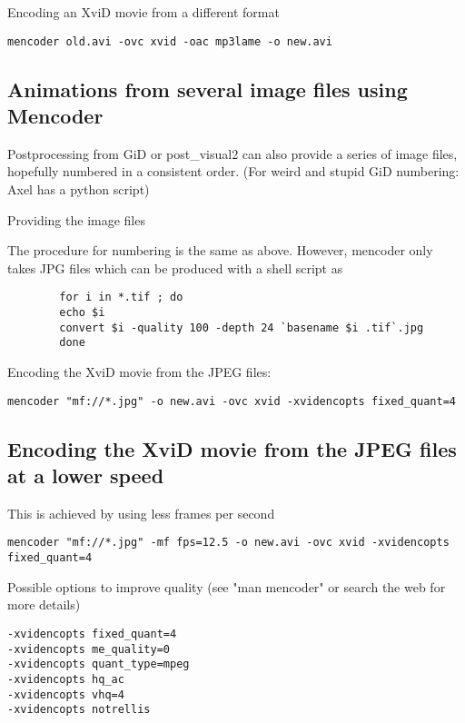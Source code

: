  Encoding an XviD movie from a different format

\begin{verbatim}
mencoder old.avi -ovc xvid -oac mp3lame -o new.avi
\end{verbatim}

\subsection{Animations from several image files using Mencoder}

 Postprocessing from GiD or post\_visual2 can also provide a series of
image files, hopefully numbered in a consistent order. (For weird and
stupid GiD numbering: Axel has a python script)

Providing the image files

 The procedure for numbering is the same as above. However, mencoder
only takes JPG files which can be produced with a shell script as

\begin{verbatim}
        for i in *.tif ; do
        echo $i
        convert $i -quality 100 -depth 24 `basename $i .tif`.jpg
        done
\end{verbatim}

Encoding the XviD movie from the JPEG files:

\begin{verbatim}
mencoder "mf://*.jpg" -o new.avi -ovc xvid -xvidencopts fixed_quant=4
\end{verbatim}

\subsection{Encoding the XviD movie from the JPEG files at a lower speed}

 This is achieved by using less frames per second

\begin{verbatim}
mencoder "mf://*.jpg" -mf fps=12.5 -o new.avi -ovc xvid -xvidencopts fixed_quant=4
\end{verbatim}

Possible options to improve quality 
 (see "man mencoder" or search the web for more details)

\begin{verbatim}
-xvidencopts fixed_quant=4
-xvidencopts me_quality=0
-xvidencopts quant_type=mpeg
-xvidencopts hq_ac
-xvidencopts vhq=4
-xvidencopts notrellis
\end{verbatim}

